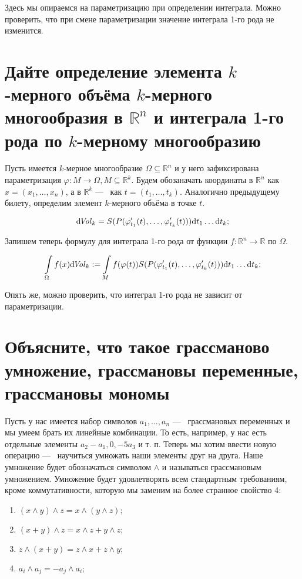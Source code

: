 \documentclass{article}
\begin{document}
	Здесь мы опираемся на параметризацию при определении интеграла. Можно проверить, что при смене параметризации значение интеграла 1-го рода не изменится. 

	\section{Дайте определение элемента $k$-мерного объёма $k$-мерного многообразия в $\mathbb{R}^n$ и интеграла 1-го рода по $k$-мерному многообразию}

	Пусть имеется $k$-мерное многообразие $\Omega \subseteq \mathbb{R}^n$ и у него зафиксирована параметризация $\varphi: M \to \Omega, M \subseteq \mathbb{R}^k$. Будем обозаначать координаты в $\mathbb{R}^n$ как $x = (x_1, \ldots, x_n)$, а в $\mathbb{R}^k$ ---~ как $t = (t_1, \ldots, t_k)$. Аналогично предыдущему билету, определим элемент $k$-мерного объёма в точке $t$.

	\[ \mathrm{d} \! \mathit{Vol}_k = S(P(\varphi'_{t_1}(t), \ldots, \varphi'_{t_k}(t))) \mathrm{d} t_1 \ldots \mathrm{d} t_k; \]

	Запишем теперь формулу для интеграла 1-го рода от функции $f:\mathbb{R}^n \to \mathbb{R}$ по $\Omega$.

	\[ \int\limits_\Omega f(x) \mathrm{d} \! \mathit{Vol}_k := \int\limits_M f(\varphi(t))S(P(\varphi'_{t_1}(t), \ldots, \varphi'_{t_k}(t))) \mathrm{d} t_1 \ldots \mathrm{d} t_k;  \]

	Опять же, можно проверить, что интеграл 1-го рода не зависит от параметризации.

	\section{Объясните, что такое грассманово умножение, грассмановы переменные, грассмановы мономы}

	Пусть у нас имеется набор символов $a_1, \ldots, a_n$ ---~ грассмановых переменных и мы умеем брать их линейные комбинации. То есть, например, у нас есть отдельные элементы $a_2 - a_1, 0, -5a_3$ и т. п. Теперь мы хотим ввести новую операцию ---~ научиться умножать наши элементы друг на друга. Наше умножение будет обозначаться символом $\land$ и называться грассмановым умножением. Умножение будет удовлетворять всем стандартным требованиям, кроме коммутативности, которую мы заменим на более странное свойство 4:

	\begin{enumerate}
		\item $(x \land y) \land z = x \land (y \land z);$
		\item $(x + y) \land z = x \land z + y \land z;$
		\item $z \land (x + y) = z \land x + z \land y;$
		\item $a_i \land a_j = -a_j \land a_i;$
	\end{enumerate}
\end{document}
